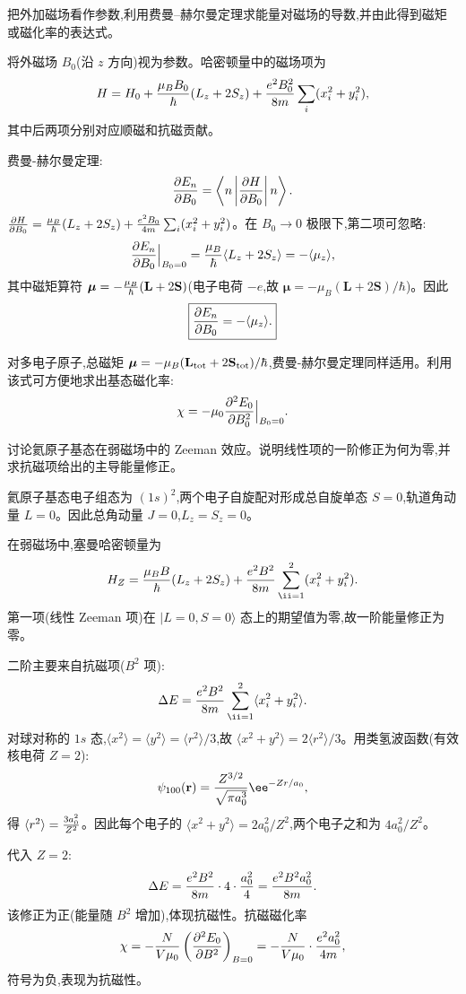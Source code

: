 \begin{question}
把外加磁场看作参数,利用费曼--赫尔曼定理求能量对磁场的导数,并由此得到磁矩或磁化率的表达式。
\end{question}
\begin{solution}
将外磁场 $B_0$(沿 $z$ 方向)视为参数。哈密顿量中的磁场项为
\[
H = H_0 + {\mu_B B_0\over\hbar}(L_z+2S_z) + {e^2B_0^2\over8m}\sum_i(x_i^2+y_i^2),
\]
其中后两项分别对应顺磁和抗磁贡献。

费曼-赫尔曼定理:
\[
{\partial E_n\over\partial B_0}
= \left\langle n\left| {\partial H\over\partial B_0} \right| n \right\rangle.
\]
${\partial H\over\partial B_0} = {\mu_B\over\hbar}(L_z+2S_z) + {e^2B_0\over4m}\sum_i(x_i^2+y_i^2)$。在 $B_0\to0$ 极限下,第二项可忽略:
\[
{\partial E_n\over\partial B_0}\Big|_{B_0=0}
= {\mu_B\over\hbar}\langle L_z+2S_z\rangle
= -\langle \mu_z\rangle,
\]
其中磁矩算符 $\boldsymbol\mu = -{\mu_B\over\hbar}(\mathbf L + 2\mathbf S)$(电子电荷 $-e$,故 $\boldsymbol\mu = -\mu_B(\mathbf L+2\mathbf S)/\hbar$)。因此
\[
\boxed{{\partial E_n\over\partial B_0} = -\langle\mu_z\rangle.}
\]

对多电子原子,总磁矩 $\boldsymbol\mu = -\mu_B(\mathbf L_{\rm tot}+2\mathbf S_{\rm tot})/\hbar$,费曼-赫尔曼定理同样适用。利用该式可方便地求出基态磁化率:
\[
\chi = -\mu_0{\partial^2 E_0\over\partial B_0^2}\Big|_{B_0=0}.
\]
\end{solution}

\begin{question}
讨论氦原子基态在弱磁场中的 Zeeman 效应。说明线性项的一阶修正为何为零,并求抗磁项给出的主导能量修正。
\end{question}
\begin{solution}
氦原子基态电子组态为 $(1s)^2$,两个电子自旋配对形成总自旋单态 $S=0$,轨道角动量 $L=0$。因此总角动量 $J=0$,$L_z=S_z=0$。

在弱磁场中,塞曼哈密顿量为
\[
H_Z = {\mu_B B\over\hbar}(L_z+2S_z) + {e^2B^2\over8m}\sum_{\ii=1}^2(x_i^2+y_i^2).
\]
第一项(线性 Zeeman 项)在 $|L=0,S=0\rangle$ 态上的期望值为零,故一阶能量修正为零。

二阶主要来自抗磁项($B^2$ 项):
\[
\Delta E = {e^2B^2\over8m}\sum_{\ii=1}^2\langle x_i^2+y_i^2\rangle.
\]
对球对称的 $1s$ 态,$\langle x^2\rangle = \langle y^2\rangle = \langle r^2\rangle/3$,故 $\langle x^2+y^2\rangle = 2\langle r^2\rangle/3$。用类氢波函数(有效核电荷 $Z=2$):
\[
\psi_{100}(\mathbf r) = {Z^{3/2}\over\sqrt{\pi a_0^3}}\ee^{-Zr/a_0},
\]
得 $\langle r^2\rangle = {3a_0^2\over Z^2}$。因此每个电子的 $\langle x^2+y^2\rangle = 2a_0^2/Z^2$,两个电子之和为 $4a_0^2/Z^2$。

代入 $Z=2$:
\[
\Delta E = {e^2B^2\over8m}\cdot 4\cdot {a_0^2\over 4} = {e^2B^2 a_0^2\over8m}.
\]
该修正为正(能量随 $B^2$ 增加),体现抗磁性。抗磁磁化率
\[
\chi = -{N\over V\mu_0}\left({\partial^2 E_0\over\partial B^2}\right)_{B=0}
= -{N\over V\mu_0}\cdot{e^2a_0^2\over4m},
\]
符号为负,表现为抗磁性。
\end{solution}

